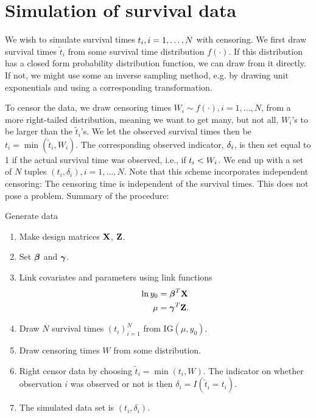 \section{Simulation of survival data}

We wish to simulate survival times $t_{i},i=1,\ldots,N$ with censoring. We first draw survival times $\tilde{t}_i$ from some survival time distribution $f(\cdot)$. If this distribution has a closed form probability distribution function, we can draw from it directly. If not, we might use some an inverse sampling method, e.g. by drawing unit exponentials and using a corresponding transformation.

To censor the data, we draw censoring times $W_i\sim f(\cdot),i=1,\ldots,N$, from a more right-tailed distribution, meaning we want to get many, but not all, $W_i$'s to be larger than the $\tilde{t}_i$'s. We let the observed survival times then be $t_i=\min(\tilde{t}_i,W_i)$.
The corresponding observed indicator, $\delta_{i}$, is then set equal to 1 if the actual survival time was observed, i.e., if $t_{i}<W_i$. We end up with a set of $N$ tuples $(t_i,\delta_i),i=1,\ldots,N$. Note that this scheme incorporates independent censoring: The censoring time is independent of the survival times. This does not pose a problem. Summary of the procedure:

\begin{algorithm}
\caption{Generate data}
\label{algo:sim}
\begin{enumerate}
    \item Make design matrices $\mathbf{X}$, $\mathbf{Z}$.
    \item Set $\boldsymbol{\beta}$ and $\boldsymbol{\gamma}$.
    \item Link covariates and parameters using link functions
        \begin{align*}
            \ln y_0&=\boldsymbol{\beta}^T\mathbf{X} \\
            \mu&=\boldsymbol{\gamma}^T\mathbf{Z}.
        \end{align*}
    \item Draw $N$ survival times $(t_i)_{i=1}^N$ from IG$(\mu,y_0)$.
    \item Draw censoring times $W$ from some distribution.
    \item Right censor data by choosing $\widetilde{t}_i=\min(t_i,W)$. The indicator on whether observation $i$ was observed or not is then $\delta_i=I(\widetilde{t}_i=t_i)$.
    \item The simulated data set is $(t_i,\delta_i)$.
\end{enumerate}
\end{algorithm}
